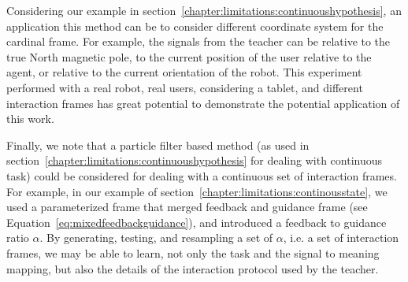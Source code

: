 Considering our example in section~\ref{chapter:limitations:continuoushypothesis}, an application this method can be to consider different coordinate system for the cardinal frame. For example, the signals from the teacher can be relative to the true North magnetic pole, to the current position of the user relative to the agent, or relative to the current orientation of the robot. This experiment performed with a real robot, real users, considering a tablet, and different interaction frames has great potential to demonstrate the potential application of this work.

Finally, we note that a particle filter based method (as used in section~\ref{chapter:limitations:continuoushypothesis} for dealing with continuous task) could be considered for dealing with a continuous set of interaction frames. For example, in our example of section~\ref{chapter:limitations:continousstate}, we used a parameterized frame that merged feedback and guidance frame (see Equation~\ref{eq:mixedfeedbackguidance}), and introduced a feedback to guidance ratio $\alpha$. By generating, testing, and resampling a set of $\alpha$, i.e. a set of interaction frames, we may be able to learn, not only the task and the signal to meaning mapping, but also the details of the interaction protocol used by the teacher.

